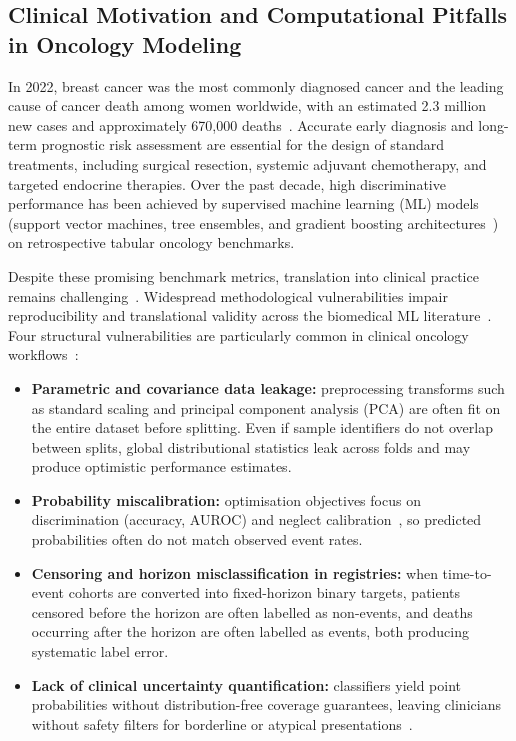 \documentclass[11pt,a4paper]{article}
\begin{document}
\subsection{Clinical Motivation and Computational Pitfalls in Oncology Modeling}\label{sec:clinical-motivation-and-comput}
In 2022, breast cancer was the most commonly diagnosed cancer and the leading cause of cancer death among women worldwide, with an estimated 2.3 million new cases and approximately 670,000 deaths~\cite{bray2024}. Accurate early diagnosis and long-term prognostic risk assessment are essential for the design of standard treatments, including surgical resection, systemic adjuvant chemotherapy, and targeted endocrine therapies. Over the past decade, high discriminative performance has been achieved by supervised machine learning (ML) models (support vector machines, tree ensembles, and gradient boosting architectures~\cite{xgboost,lightgbm}) on retrospective tabular oncology benchmarks.

Despite these promising benchmark metrics, translation into clinical practice remains challenging~\cite{kubiak2025}. Widespread methodological vulnerabilities impair reproducibility and translational validity across the biomedical ML literature~\cite{kapoor2023}. Four structural vulnerabilities are particularly common in clinical oncology workflows~\cite{collins2025onc}:
\begin{itemize}
\item \textbf{Parametric and covariance data leakage:} preprocessing transforms such as standard scaling and principal component analysis (PCA) are often fit on the entire dataset before splitting. Even if sample identifiers do not overlap between splits, global distributional statistics leak across folds and may produce optimistic performance estimates.
\item \textbf{Probability miscalibration:} optimisation objectives focus on discrimination (accuracy, AUROC) and neglect calibration~\cite{vancalster2016,steyerberg2019}, so predicted probabilities often do not match observed event rates.
\item \textbf{Censoring and horizon misclassification in registries:} when time-to-event cohorts are converted into fixed-horizon binary targets, patients censored before the horizon are often labelled as non-events, and deaths occurring after the horizon are often labelled as events, both producing systematic label error.
\item \textbf{Lack of clinical uncertainty quantification:} classifiers yield point probabilities without distribution-free coverage guarantees, leaving clinicians without safety filters for borderline or atypical presentations~\cite{vazquez2022}.
\end{itemize}
\end{document}
